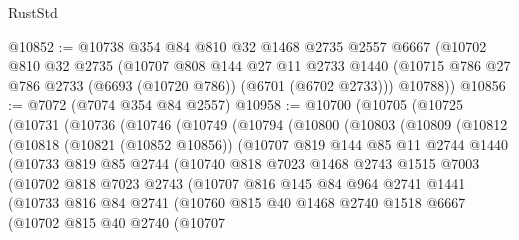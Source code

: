\begin{lexlean}{RustStd}
\begin{coremodule}
@10852 := @10738
    @354
    @84
    @810
    @32
    @1468
    @2735
    @2557
    @6667
    (@10702
      @810
      @32
      @2735
      (@10707
        @808
        @144
        @27
        @11
        @2733
        @1440
        (@10715 @786 @27 @786 @2733 (@6693 (@10720 @786)) (@6701 (@6702 @2733)))
        @10788))
@10856 := @7072 (@7074 @354 @84 @2557)
@10958 := @10700
    (@10705
      (@10725
        (@10731
          (@10736
            (@10746
              (@10749
                (@10794
                  (@10800
                    (@10803
                      (@10809
                        (@10812
                          (@10818
                            (@10821 (@10852 @10856))
                            (@10707
                              @819
                              @144
                              @85
                              @11
                              @2744
                              @1440
                              (@10733
                                @819
                                @85
                                @2744
                                (@10740
                                  @818
                                  @7023
                                  @1468
                                  @2743
                                  @1515
                                  @7003
                                  (@10702
                                    @818
                                    @7023
                                    @2743
                                    (@10707
                                      @816
                                      @145
                                      @84
                                      @964
                                      @2741
                                      @1441
                                      (@10733
                                        @816
                                        @84
                                        @2741
                                        (@10760
                                          @815
                                          @40
                                          @1468
                                          @2740
                                          @1518
                                          @6667
                                          (@10702
                                            @815
                                            @40
                                            @2740
                                            (@10707

\end{coremodule}
\end{lexlean}
